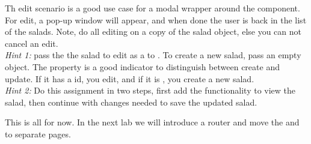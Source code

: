\documentclass[fleqn, article, a4paper]{memoir}
\begin{document}
\begin{Assignments}
Th edit scenario is a good use case for a modal wrapper around the  component. For edit, a pop-up window will appear, and when done the user is back in the list of the salads. Note, do all editing on a copy of the salad object, else you can not cancel an edit.
\\ \emph{Hint 1: } pass the the salad to edit as a  to . To create a new salad, pass an empty object. The  property is a good indicator to distinguish between create and update. If it has a id, you edit, and if it is , you create a new salad. 
\\ \emph{Hint 2: } Do this assignment in two steps, first add the functionality to view the salad, then continue with changes needed to save the updated salad.

\item This is all for now. In the next lab we will introduce a router and move the  and  to separate pages.

\end{Assignments}


\end{document}
